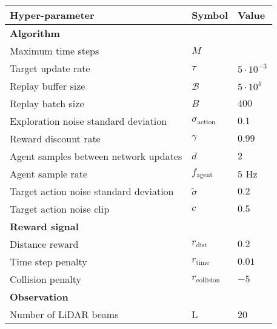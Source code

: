 
\begin{table}[htb!]
\centering
\small
\begin{tabularx}{0.95\textwidth}{RCL} 
    \hline
    \textbf{Hyper-parameter} & \textbf{Symbol} & \textbf{Value} \\ 
    \hline
    \textbf{Algorithm}                      &                           & \\
    Maximum time steps                      & $M$                       &  \\
    Target update rate                      & $\tau$                    & $5\cdot10^{-3}$ \\
    Replay buffer size                      & $\mathcal{B}$             & $5\cdot 10^5$ \\
    Replay batch size                       & $B$                       & $400$ \\
    Exploration noise standard deviation    & $\sigma_{\text{action}}$  & $0.1$ \\
    Reward discount rate                    & $\gamma$                  & $0.99$ \\
    Agent samples between network updates   & $d$                       & $2$ \\
    Agent sample rate                       & $f_{\text{agent}}$        & $5$ Hz \\
    Target action noise standard deviation  & $\tilde{\sigma}$          & $0.2$ \\ 
    Target action noise clip                & $c$                       & $0.5$ \\
    \textbf{Reward signal}                  &                           & \\
    Distance reward                         & $r_{\text{dist}}$         & $0.2$ \\ 
    Time step penalty                       & $r_{\text{time}}$         & $0.01$ \\
    Collision penalty                       & $r_{\text{collision}}$    & $-5$ \\
    \textbf{Observation}                    &                           & \\
    Number of LiDAR beams                   & L                         & 20 \\

\end{tabularx}
\end{table}
